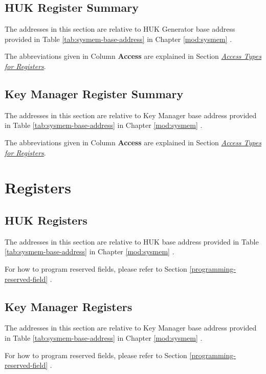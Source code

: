 \documentclass[main\_\_EN.tex]{subfiles}
\begin{document}
\subsection{HUK Register Summary}
The addresses in this section are relative to HUK Generator base address provided in Table \ref{tab:sysmem-base-address} in Chapter \ref{mod:sysmem} \textit{}.

The abbreviations given in Column \textbf{Access} are explained in Section \hyperref[glossary-access-types]{\textit{Access Types for Registers}}.


\subsection{Key Manager Register Summary}
The addresses in this section are relative to Key Manager base address provided in Table \ref{tab:sysmem-base-address} in Chapter \ref{mod:sysmem} \textit{}.

The abbreviations given in Column \textbf{Access} are explained in Section \hyperref[glossary-access-types]{\textit{Access Types for Registers}}.


\section{Registers}

\subsection{HUK Registers}
The addresses in this section are relative to HUK base address provided in Table \ref{tab:sysmem-base-address} in Chapter \ref{mod:sysmem} \textit{}.

For how to program reserved fields, please refer to Section \ref{programming-reserved-field} \textit{}.



\subsection{Key Manager Registers}
The addresses in this section are relative to Key Manager base address provided in Table \ref{tab:sysmem-base-address} in Chapter \ref{mod:sysmem} \textit{}.

For how to program reserved fields, please refer to Section \ref{programming-reserved-field} \textit{}.

\end{document}
